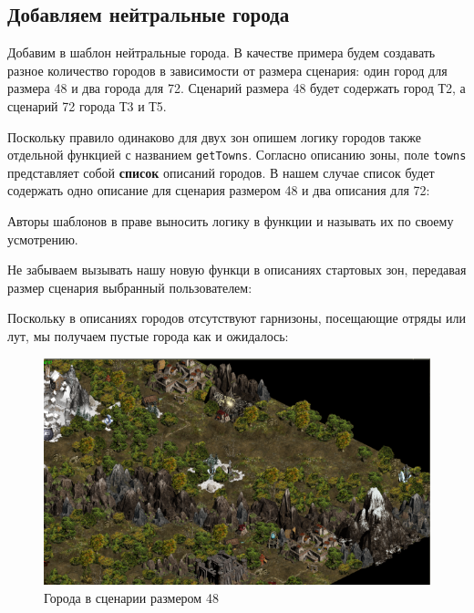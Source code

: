 \subsection{Добавляем нейтральные города}
Добавим в шаблон нейтральные города. В качестве примера будем создавать разное количество городов в зависимости от размера сценария: один город для размера 48 и два города для 72. Сценарий размера 48 будет содержать город Т2, а сценарий 72 города Т3 и Т5.

Поскольку правило одинаково для двух зон опишем логику городов также отдельной функцией с названием \texttt{getTowns}. Согласно описанию зоны, поле \texttt{towns} представляет собой \textbf{список} описаний городов. В нашем случае список будет содержать одно описание для сценария размером 48 и два описания для 72:

\begin{figure}[H]

\end{figure}

Авторы шаблонов в праве выносить логику в функции и называть их по своему усмотрению.

Не забываем вызывать нашу новую функци в описаниях стартовых зон, передавая размер сценария выбранный пользователем:

\begin{figure}[H]


\end{figure}

Поскольку в описаниях городов отсутствуют гарнизоны, посещающие отряды или лут, мы получаем пустые города как и ожидалось:

\begin{figure}[H]
\center
\includegraphics[width=1.0\linewidth]{docImages/scenario48Towns.png}
\caption{Города в сценарии размером 48}
\end{figure}

